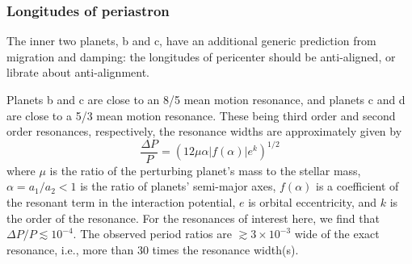 \documentclass[twocolumn]{aastex63}
\begin{document}
\subsubsection{Longitudes of periastron}

The inner two planets, b and c, have an additional generic prediction from 
migration and damping:
the longitudes of pericenter should be anti-aligned, or librate about
anti-alignment. %

Planets b and c are close to an 8/5 mean motion resonance, and planets c and d are close to a 5/3 mean motion resonance. These being third order and second order resonances, respectively, the resonance widths are approximately given by~\citep{Murray1999}
\begin{equation}
\frac{\Delta P}{P} = (12\mu\alpha |f(\alpha)| e^k)^{1/2}
\label{e:reswidth}\end{equation}
where $\mu$ is the ratio of the perturbing planet's mass to the stellar mass, $\alpha{=}a_1/a_2{<}1$ is the ratio of planets' semi-major axes, $f(\alpha)$ is a coefficient of the resonant term in the interaction potential, $e$ is orbital eccentricity, and $k$ is the order of the resonance.  For the resonances of interest here, we find that $\Delta P/P\lesssim10^{-4}$. The observed period ratios are $\gtrsim3\times10^{-3}$ wide of the exact resonance, i.e., more than 30 times the resonance width(s).
\end{document}
